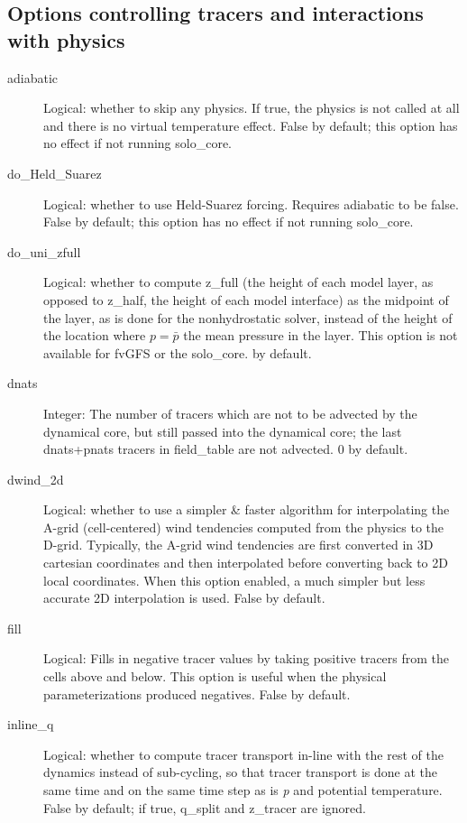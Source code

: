 \documentclass[12pt,letterpaper]{book}
\begin{document}
\subsection{Options controlling tracers and interactions with physics}

\begin{description}

\item[adiabatic] Logical: whether to skip any physics. If true, the physics is not called at all and there is no virtual temperature effect. False by default; this option has no effect if not running solo\_core.


\item[do\_Held\_Suarez] Logical: whether to use Held-Suarez forcing. Requires adiabatic to be false. False by default; this option has no effect if not running solo\_core. 

\item[do\_uni\_zfull] Logical: whether to compute z\_full (the height of each model layer, as opposed to z\_half, the height of each model interface) as the midpoint of the layer, as is done for the nonhydrostatic solver, instead of the height of the location where $p = \bar{p}$ the mean pressure in the layer. This option is not available for fvGFS or the solo\_core. \false  by default.

\item[dnats] Integer: The number of tracers which are not to be advected by the dynamical core, but still passed into the dynamical core; the last dnats+pnats tracers in field\_table are not advected. 
0 by default.


\item[dwind\_2d] Logical: whether to use a simpler \& faster algorithm for interpolating the A-grid 
(cell-centered) wind tendencies computed from the physics to the D-grid. Typically, the A-grid wind tendencies are first converted in 
3D cartesian coordinates and then interpolated before converting back to 
2D local coordinates. When this option enabled, a much simpler but less accurate 
2D interpolation is used. False by default. 


\item[fill] Logical: Fills in negative tracer values by taking positive tracers from the cells above and below. This option is useful when the physical parameterizations produced negatives. False by default.


\item[inline\_q] Logical: whether to compute tracer transport in-line with the rest of the dynamics instead of sub-cycling, so that tracer transport is done at the same time and on the same time step as is \textit{p} and potential temperature. False by default; if true, q\_split and z\_tracer are ignored. 



\end{description}
\end{document}

